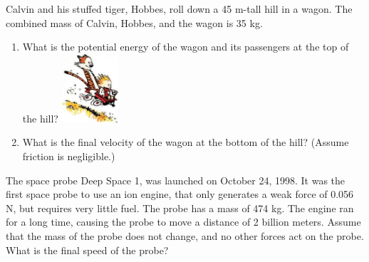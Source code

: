 \documentclass[11pt]{examdesign}
\begin{document}
\begin{shortanswer}[title={Free Response}, rearrange=no]
	

	\begin{question} 
		Calvin and his stuffed tiger, Hobbes, roll down a 45 m-tall hill in a wagon.  The combined mass of Calvin, Hobbes, and the wagon is 35 kg.  
		\begin{enumerate}
			\item {What is the potential energy of the wagon and its passengers at the top of the hill?}
				\includegraphics[height=1in]{hc.jpg}
			\vspace{.75in}
			\item{What is the final velocity of the wagon at the bottom of the hill?  (Assume friction is negligible.)}
			\vspace{1.25in}
		\end{enumerate}
	\end{question}

	\begin{question} 
	The space probe Deep Space 1, was launched on October 24, 1998.  It was the first space probe to use an ion engine, that only generates a weak force of 0.056 N, but requires very little fuel.  The probe has a mass of 474 kg.  The engine ran for a long time, causing the probe to move a distance of 2 billion meters.  Assume that the mass of the probe does not change, and no other forces act on the probe.  What is the final speed of the probe?



	\end{question}


	
\end{shortanswer}
\end{document}

